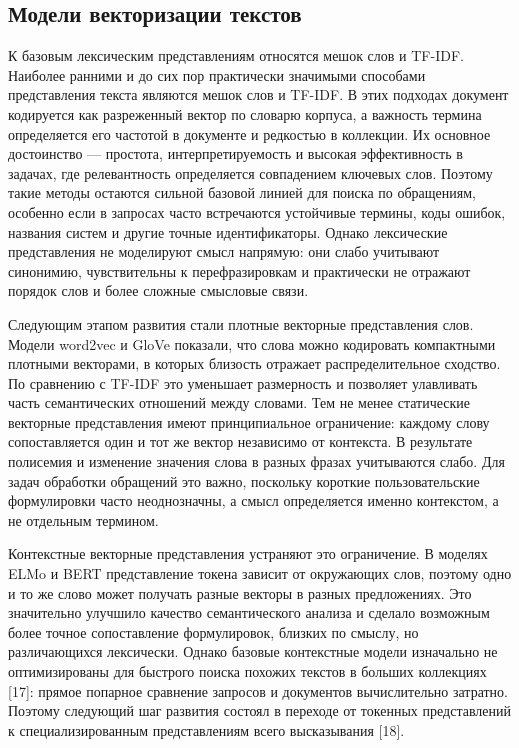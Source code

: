 \documentclass[14pt,a4paper]{extarticle}
\numberwithin{figure}{section}
\numberwithin{table}{section}
\begin{document}
\subsection{Модели векторизации
текстов}

К базовым лексическим представлениям относятся мешок слов и TF-IDF. Наиболее ранними и до сих пор практически значимыми способами
представления текста являются мешок слов и TF-IDF. В этих подходах
документ кодируется как разреженный вектор по словарю корпуса, а
важность термина определяется его частотой в документе и редкостью в
коллекции. Их основное достоинство --- простота, интерпретируемость и
высокая эффективность в задачах, где релевантность определяется
совпадением ключевых слов. Поэтому такие методы остаются сильной базовой
линией для поиска по обращениям, особенно если в запросах часто
встречаются устойчивые термины, коды ошибок, названия систем и другие
точные идентификаторы. Однако лексические представления не моделируют
смысл напрямую: они слабо учитывают синонимию, чувствительны к
перефразировкам и практически не отражают порядок слов и более сложные
смысловые связи.

Следующим этапом развития стали плотные векторные представления слов.
Модели word2vec и GloVe показали, что слова можно кодировать компактными
плотными векторами, в которых близость отражает распределительное сходство.
По сравнению с TF-IDF это уменьшает размерность и позволяет улавливать
часть семантических отношений между словами. Тем не менее статические
векторные представления имеют принципиальное ограничение: каждому слову
сопоставляется один и тот же вектор независимо от контекста. В
результате полисемия и изменение значения слова в разных фразах
учитываются слабо. Для задач обработки обращений это важно, поскольку
короткие пользовательские формулировки часто неоднозначны, а смысл
определяется именно контекстом, а не отдельным термином.

Контекстные векторные представления устраняют это ограничение. В моделях ELMo и BERT
представление токена зависит от окружающих слов, поэтому одно и то же
слово может получать разные векторы в разных предложениях. Это
значительно улучшило качество семантического анализа и сделало возможным
более точное сопоставление формулировок, близких по смыслу, но
различающихся лексически. Однако базовые контекстные модели изначально
не оптимизированы для быстрого поиска похожих текстов в больших
коллекциях [17]: прямое попарное сравнение запросов и документов
вычислительно затратно. Поэтому следующий шаг развития состоял в
переходе от токенных представлений к специализированным представлениям
всего высказывания [18].
\end{document}
